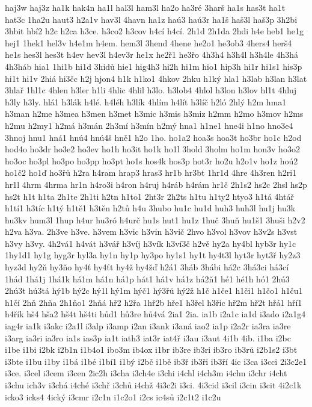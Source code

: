 haj3w
haj3z
ha1k
hak4n
ha1l
hal3l
ham3l
ha2o
ha3ré
3harš
ha1s
has3t
ha1t
hat3c
1ha2u
haut3
h2a1v
hav3l
4havn
ha1z
haú3
haú3r
ha1š
haš3l
haš3p
3h2bi
3hbit
hbí2
h2c
h2ca
h3ce.
h3co2
h3cov
h4cí
h4cí.
2h1d
2h1da
2hdi
h4e
heb1
he1g
hej1
1hek1
hel3v
h4e1m
h4em.
hem3l
3hend
4hene
he2o1
he3ob3
4hers4
herš4
he1s
hes3l
hes3t
h4ev
hev3l
h4ev3r
he1x
he2ř1
he3řo
4h3h4
h3h4l
h3h4le
4h3há
4h3háb
hia1
1hi1b
hi1d
3hidů
hie1
hig4h3
hi2h
hi1m
hio1
hip3h
hi1r
hi1s1
his3p
hi1t
hi1v
2hiá
hi3čc
h2j
hjon4
h1k
h1ko1
4hkov
2hku
h1ký
hla1
h3lab
h3lan
h3lat
3hlař
1hl1c
4hlen
h3ler
h1li
4hlic
4hlil
h3lo.
h3lob4
4hlol
h3lon
h3lov
hl1t
4hluj
h3ly
h3ly.
hlá1
h3lák
h4lé.
h4léh
h3lík
4hlím
h4lít
h3líč
h2ló
2hlý
h2m
hma1
h3man
h2me
h3mea
h3men
h3met
h3mic
h3mis
h3miz
h2mm
h2mo
h3mov
h2ms
h2mu
h2my1
h2má
h3mán
2h3mí
h3mín
h2mý
hna1
h1ne1
hne4i
h1no
hno3e4
3hnoj
hnu1
hná1
hnú4
hnú4š
hně1
h2o
1ho.
ho1a2
hoa3s
hoa3t
ho3br
ho1c
h2od
hod4o
ho3dr
ho3e2
ho3ev
ho1h
ho3it
ho1k
ho1l
3hold
3holm
ho1m
hon3v
ho3o2
ho3oc
ho3pl
ho3po
ho3pp
ho3pt
ho1s
hos4k
hos3p
hot3r
ho2u
h2o1v
ho1z
hoú2
ho1č2
ho1ď
ho3řů
h2ra
h4ram
hrap3
hras3
hr1b
hr3bt
1hr1d
4hre
4h3ren
h2ri1
hr1l
4hrm
4hrma
hr1n
h4ro3i
h4ron
h4ruj
h4ráb
h4rám
hr1č
2h1s2
hs2c
2hsl
hs2p
hs2t
h1t
h1ta
2h1te
2h1ti
h2tn
h1to1
2ht3r
2h2ts
h1tu
h1ty2
htyo3
h1tá
4htář
h1tí1
h3tíc
h1tý
h1tě1
h3těn
h2tů
h4u
3hubo
hu1c
hu1d
huh3
huh3l
hu1j
hu3k
hu3kv
hum3l
1hup
h4ur
hu3ró
h4urč
hu1s
hut1
hu1z
1huč
3huň
hu1š1
3huši
h2v2
h2va
h3va.
2h3ve
h3ve.
h3vem
h3vic
h3vin
h3vič
2hvo
h3vol
h3vov
h3v2s
h3vst
h3vy
h3vy.
4h2vá1
h4vát
h3vář
h3víj
h3vík
h3ví3č
h2vě
hy2a
hy4bl
hyb3r
hy1c
1hy1d1
hy1g
hyg3r
hyl3a
hy1n
hy1p
hy3po
hy1s1
hy1t
hy4t3l
hyt3r
hyt3ř
hy2z3
hyz3d
hy2ň
hy3ňo
hy4ť
hy4ťt
hy4ž
hy4žď
h2á1
3háb
3hábi
há2c
3há3ci
há3cí
1hád
1há1j
1há1k
há1m
há1n
há1p
hát1
há1v
há1z
há2ň1
hé1
hé1h
hó1
2hú3
2hú3t
hú3tá
hý1b
hý2c
hý1l
hý1m
hýč1
hý3řů
hý2ž
h1č
h1če1
h1či1
h1čo1
h1ču1
h1čí
2hň
2hňa
2h1ňo1
2hňá
hř2
h2řa
1hř2b
hře1
h3řel
h3řic
hř2m
hř2t
hřá1
hří1
h4řík
hš4
hša2
hš4t
hš4ti
hůd1
hů3re
hů4vá
2ia1
2ia.
ia1b
i2a1c
ia1d
i3ado
i2a1g4
iag4r
ia1k
i3akc
i2a1l
i3alp
i3amp
i2an
i3ank
i3aná
iao2
ia1p
i2a2r
ia3ra
ia3re
i3arg
ia3ri
ia3ro
ia1s
ias3p
ia1t
iath3
iat3r
iat4ř
i3au
i3aut
4i1b
4ib.
i1ba
i2bc
i1be
i1bi
i2bk
i2b1n
i1b4o1
ibo3m
ib4ox
i1br
ib3re
ib3ri
ib3ro
ib3rů
i2b1s2
i3bt
i3bte
i1bu
i1by
i1bá
i1bé
i1bí1
i1bý
i2bč
i1bě
ib3ř
ib3ři
ib3ří
4ic
i3ca
i3cci
2i3c2e1
i3ce.
i3cel
i3cem
i3cen
2ic2h
i3cha
i3ch4e
i3chi
i4chl
i4ch3m
i4chn
i3chr
i4cht
i3chu
ich3v
i3chá
i4ché
i3chř
i3chů
i4chž
4i3c2i
i3ci.
4i3cid
i3cil
i3cin
i3cit
4i2c1k
icko3
icks4
4ický
i3cmr
i2c1n
i1c2o1
i2cs
ic4sů
i2c1t2
i1c2u
